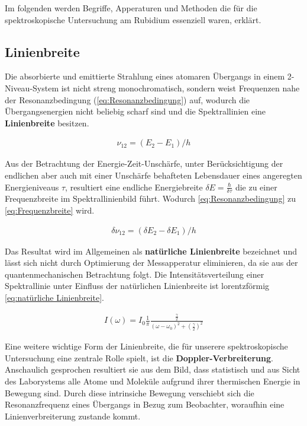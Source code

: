  \noindent Im folgenden werden Begriffe, Apperaturen und Methoden die für die spektroskopische Untersuchung am Rubidium essenziell waren, erklärt.

\subsection{Linienbreite}

\noindent Die absorbierte und emittierte Strahlung eines atomaren Übergangs in einem 2-Niveau-System ist nicht streng monochromatisch, sondern weist Frequenzen nahe der Resonanzbedingung (\ref{eq:Resonanzbedingung}) auf, wodurch die Übergangsenergien nicht beliebig scharf sind und die Spektrallinien eine \textbf{Linienbreite} besitzen.

\begin{align}
    \nu_{12}=(E_{2}-E_{1})/ h \label{eq:Resonanzbedingung}
\end{align}

\noindent Aus der Betrachtung der Energie-Zeit-Unschärfe, unter Berücksichtigung der endlichen aber auch mit einer Unschärfe behafteten Lebensdauer eines angeregten Energieniveaus $\tau$, resultiert eine endliche Energiebreite $\delta E= \frac{\hbar}{\delta \tau}$ die zu einer Frequenzbreite im Spektrallinienbild führt. Wodurch \ref{eq:Resonanzbedingung} zu \ref{eq:Frequenzbreite} wird.

\begin{align}
    \delta \nu_{12}=(\delta E_{2}-\delta E_{1})/ h \label{eq:Frequenzbreite}
\end{align}

\noindent Das Resultat wird im Allgemeinen als \textbf{natürliche Linienbreite} bezeichnet und lässt sich nicht durch Optimierung der Messapperatur eliminieren, da sie aus der quantenmechanischen Betrachtung folgt. Die Intensitätsverteilung einer Spektrallinie unter Einfluss der natürlichen Linienbreite ist lorentzförmig \ref{eq:natürliche Linienbreite}.

\begin{align}
    I(\omega)=I_{0}\frac{1}{\pi}\frac{\frac{\gamma}{2}}{(\omega-\omega_{0})^2+(\frac{\gamma}{2})^2} \label{eq:natürliche Linienbreite}
\end{align}

\noindent Eine weitere wichtige Form der Linienbreite, die für unserere spektroskopische Untersuchung eine zentrale Rolle spielt, ist die \textbf{Doppler-Verbreiterung}. Anschaulich gesprochen resultiert sie aus dem Bild, dass statistisch und aus Sicht des Laborystems alle Atome und Moleküle aufgrund ihrer thermischen Energie in Bewegung sind. Durch diese intrinsiche Bewegung verschiebt sich die Resonanzfrequenz eines Übergangs in Bezug zum Beobachter, woraufhin eine Linienverbreiterung zustande kommt.

